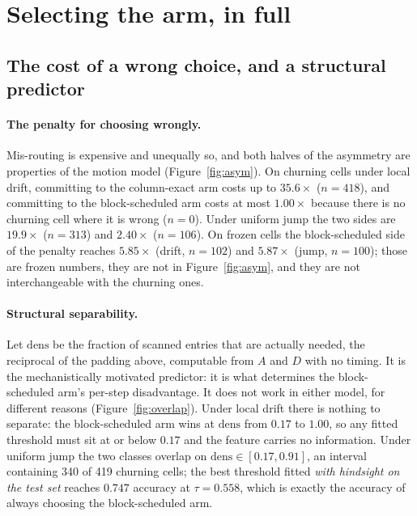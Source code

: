 \documentclass{article}
\begin{document}
\section{Selecting the arm, in full}
\label{app:selection}

\subsection{The cost of a wrong choice, and a structural predictor}

\paragraph{The penalty for choosing wrongly.}
Mis-routing is expensive and unequally so, and both halves of the asymmetry are
properties of the motion model (Figure~\ref{fig:asym}). On churning cells under
local drift, committing to the column-exact arm costs up to $35.6\times$
($n{=}418$), and committing to the block-scheduled arm costs at most
$1.00\times$ because there is no churning cell where it is wrong ($n{=}0$).
Under uniform jump the two sides are $19.9\times$ ($n{=}313$) and $2.40\times$
($n{=}106$). On frozen cells the block-scheduled side of the penalty reaches
$5.85\times$ (drift, $n{=}102$) and $5.87\times$ (jump, $n{=}100$); those are
frozen numbers, they are not in Figure~\ref{fig:asym}, and they are not
interchangeable with the churning ones.

\paragraph{Structural separability.}
Let $\mathrm{dens}$ be the fraction of scanned entries that are actually needed,
the reciprocal of the padding above, computable from $A$
and $D$ with no timing. It is the mechanistically motivated predictor: it is
what determines the block-scheduled arm's per-step disadvantage. It does not
work in either model, for different reasons (Figure~\ref{fig:overlap}). Under
local drift there is nothing to separate: the block-scheduled arm wins at
$\mathrm{dens}$ from $0.17$ to $1.00$, so any fitted threshold must sit at or
below $0.17$ and the feature carries no information. Under uniform jump the two
classes overlap on $\mathrm{dens} \in [0.17, 0.91]$, an interval containing 340
of 419 churning cells; the best threshold fitted \emph{with hindsight on the test
set} reaches $0.747$ accuracy at $\tau = 0.558$, which is exactly the accuracy of
always choosing the block-scheduled arm.
\end{document}
